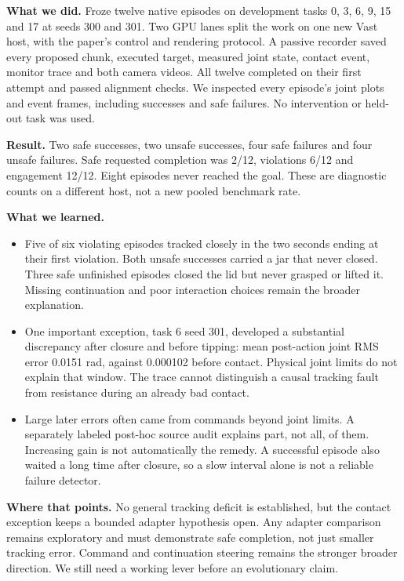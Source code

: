 \documentclass[11pt,a4paper]{article}
\begin{document}
\textbf{What we did.} Froze twelve native episodes on development tasks 0, 3, 6, 9, 15 and 17 at seeds 300 and 301. Two GPU lanes split the work on one new Vast host, with the paper's control and rendering protocol. A passive recorder saved every proposed chunk, executed target, measured joint state, contact event, monitor trace and both camera videos. All twelve completed on their first attempt and passed alignment checks. We inspected every episode's joint plots and event frames, including successes and safe failures. No intervention or held-out task was used.

\textbf{Result.} Two safe successes, two unsafe successes, four safe failures and four unsafe failures. Safe requested completion was 2/12, violations 6/12 and engagement 12/12. Eight episodes never reached the goal. These are diagnostic counts on a different host, not a new pooled benchmark rate.

\textbf{What we learned.}
\begin{itemize}\setlength\itemsep{1pt}
  \item Five of six violating episodes tracked closely in the two seconds ending at their first violation. Both unsafe successes carried a jar that never closed. Three safe unfinished episodes closed the lid but never grasped or lifted it. Missing continuation and poor interaction choices remain the broader explanation.
  \item One important exception, task 6 seed 301, developed a substantial discrepancy after closure and before tipping: mean post-action joint RMS error 0.0151 rad, against 0.000102 before contact. Physical joint limits do not explain that window. The trace cannot distinguish a causal tracking fault from resistance during an already bad contact.
  \item Large later errors often came from commands beyond joint limits. A separately labeled post-hoc source audit explains part, not all, of them. Increasing gain is not automatically the remedy. A successful episode also waited a long time after closure, so a slow interval alone is not a reliable failure detector.
\end{itemize}

\textbf{Where that points.} No general tracking deficit is established, but the contact exception keeps a bounded adapter hypothesis open. Any adapter comparison remains exploratory and must demonstrate safe completion, not just smaller tracking error. Command and continuation steering remains the stronger broader direction. We still need a working lever before an evolutionary claim.
\end{document}
